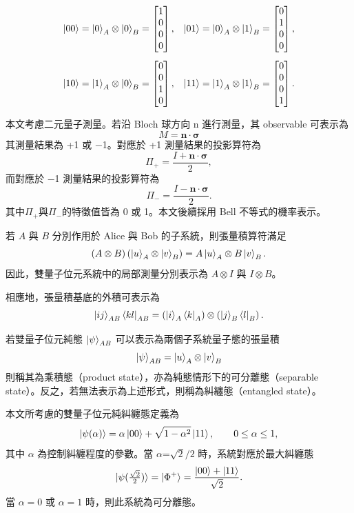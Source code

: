 \documentclass[12pt, a4paper, twoside, reqno]{article}
\begin{document}
\[
\begin{aligned}
\ket{00}
&=
\ket{0}_A\otimes\ket{0}_B
=
\begin{bmatrix}
1\\0\\0\\0
\end{bmatrix},
&
\ket{01}
&=
\ket{0}_A\otimes\ket{1}_B
=
\begin{bmatrix}
0\\1\\0\\0
\end{bmatrix},
\\[0.5em]
\ket{10}
&=
\ket{1}_A\otimes\ket{0}_B
=
\begin{bmatrix}
0\\0\\1\\0
\end{bmatrix},
&
\ket{11}
&=
\ket{1}_A\otimes\ket{1}_B
=
\begin{bmatrix}
0\\0\\0\\1
\end{bmatrix}.
\end{aligned}
\]

\indent 本文考慮二元量子測量。若沿 Bloch 球方向 n 進行測量，其 observable 可表示為
\[
    M = \bm{n}\cdot\bm{\sigma}
    \]
其測量結果為 +1 或 −1。對應於 +1 測量結果的投影算符為
\[
    \Pi_+ = \frac{I+\bm{n}\cdot\bm{\sigma}}{2},
    \]
而對應於 −1 測量結果的投影算符為
\[
    \Pi_- = \frac{I-\bm{n}\cdot\bm{\sigma}}{2}.
    \]
其中$\Pi_+$與$\Pi_-$的特徵值皆為 0 或 1。本文後續採用 Bell 不等式的機率表示。

\noindent 若 $A$ 與 $B$ 分別作用於 Alice 與 Bob 的子系統，則張量積算符滿足
\[
(A\otimes B)
\left(
\ket{u}_A\otimes\ket{v}_B
\right)
=
A\ket{u}_A\otimes B\ket{v}_B.
\]
因此，雙量子位元系統中的局部測量分別表示為 $A \otimes I$ 與 $I \otimes B$。


\noindent 相應地，張量積基底的外積可表示為
\[
\ket{ij}_{AB}\bra{kl}_{AB}
=
\left(\ket{i}_A\bra{k}_A\right)
\otimes
\left(\ket{j}_B\bra{l}_B\right).
\]

\indent 若雙量子位元純態 $\ket{\psi}_{AB}$ 可以表示為兩個子系統量子態的張量積
\[
    \ket{\psi}_{AB}=\ket{u}_A\otimes\ket{v}_B
\]
則稱其為乘積態（product state），亦為純態情形下的可分離態（separable state）。反之，若無法表示為上述形式，則稱為糾纏態（entangled state）。

\indent 本文所考慮的雙量子位元純糾纏態定義為
\begin{equation}
    \ket{\psi(\alpha)}=\alpha\ket{00}+\sqrt{1-\alpha^2}\ket{11},
    \qquad
    0\leq\alpha\leq 1,
    \label{eq:entangled-state-alpha}
\end{equation}
\noindent 其中 $\alpha$ 為控制糾纏程度的參數。當 $\alpha$=$\sqrt2/2$ 時，系統對應於最大糾纏態
\begin{equation}
    \ket{\psi(\tfrac{\sqrt2}{2})}=\ket{\Phi^+}=\frac{\ket{00}+\ket{11}}{\sqrt{2}}.
    \label{eq:max-entangled-state}
\end{equation}
\noindent 當 $\alpha=0$ 或 $\alpha=1$ 時，則此系統為可分離態。
\end{document}
